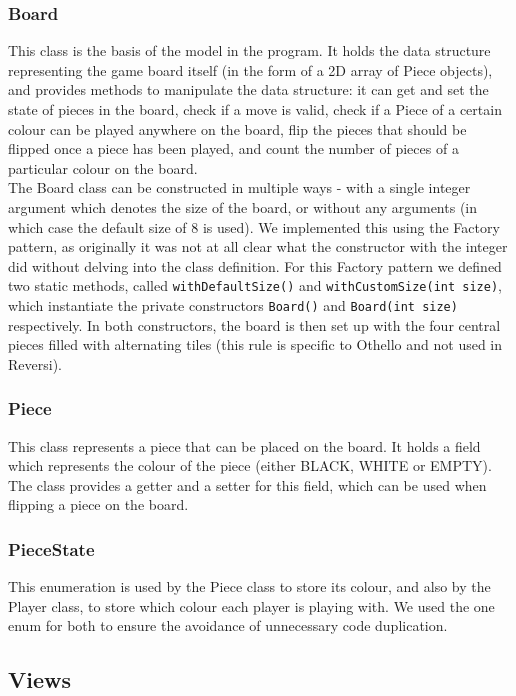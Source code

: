 \documentclass[11pt,a4paper,oneside]{article}
\begin{document}
\subsubsection*{Board}
This class is the basis of the model in the program. It holds the data structure representing the game board itself (in the form of a 2D array of Piece objects), and provides methods to manipulate the data structure: it can get and set the state of pieces in the board, check if a move is valid, check if a Piece of a certain colour can be played anywhere on the board, flip the pieces that should be flipped once a piece has been played, and count the number of pieces of a particular colour on the board.\\
\indent The Board class can be constructed in multiple ways - with a single integer argument which denotes the size of the board, or without any arguments (in which case the default size of 8 is used). We implemented this using the Factory pattern, as originally it was not at all clear what the constructor with the integer did without delving into the class definition. For this Factory pattern we defined two static methods, called \texttt{withDefaultSize()} and \texttt{withCustomSize(int size)}, which instantiate the private constructors \texttt{Board()} and \texttt{Board(int size)} respectively. In both constructors, the board is then set up with the four central pieces filled with alternating tiles (this rule is specific to Othello and not used in Reversi). 

\subsubsection*{Piece}
This class represents a piece that can be placed on the board. It holds a field which represents the colour of the piece (either BLACK, WHITE or EMPTY). The class provides a getter and a setter for this field, which can be used when flipping a piece on the board. 

\subsubsection*{PieceState}
This enumeration is used by the Piece class to store its colour, and also by the Player class, to store which colour each player is playing with. We used the one enum for both to ensure the avoidance of unnecessary code duplication.

\subsection*{Views}
\end{document}
